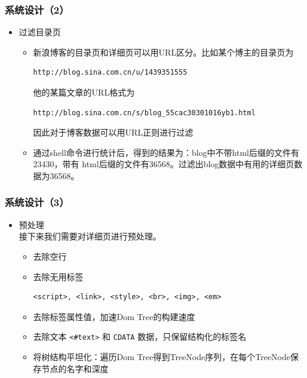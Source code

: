 \documentclass[11pt,presentation]{beamer}
\begin{document}
\begin{frame}[fragile]
\frametitle{系统设计（2）}
\label{sec-2-4}
\begin{itemize}

\item 过滤目录页
\label{sec-2-4-1}%
\begin{itemize}
\item 新浪博客的目录页和详细页可以用URL区分。比如某个博主的目录页为
  \tiny

\begin{verbatim}
http://blog.sina.com.cn/u/1439351555
\end{verbatim}
  \normalsize
  他的某篇文章的URL格式为
  \tiny

\begin{verbatim}
http://blog.sina.com.cn/s/blog_55cac30301016yb1.html
\end{verbatim}
  \normalsize
  因此对于博客数据可以用URL正则进行过滤
\item 通过shell命令进行统计后，得到的结果为：blog中不带html后缀的文件有23430，带有
  html后缀的文件有36568。过滤出blog数据中有用的详细页数据为36568。
\end{itemize}

\end{itemize} %
\end{frame}
\begin{frame}[fragile]
\frametitle{系统设计（3）}
\label{sec-2-5}
\begin{itemize}

\item 预处理\\
\label{sec-2-5-1}%
接下来我们需要对详细页进行预处理。
\begin{itemize}
\item 去除空行
\item 去除无用标签

\begin{verbatim}
<script>, <link>, <style>, <br>, <img>, <em>
\end{verbatim}
\item 去除标签属性值，加速Dom Tree的构建速度
\item 去除文本 \texttt{<\#text>} 和 \texttt{CDATA} 数据，只保留结构化的标签名
\item 将树结构平坦化：遍历Dom Tree得到TreeNode序列，在每个TreeNode保存节点的名字和深度
\end{itemize}
\end{itemize} %
\end{frame}
\end{document}
